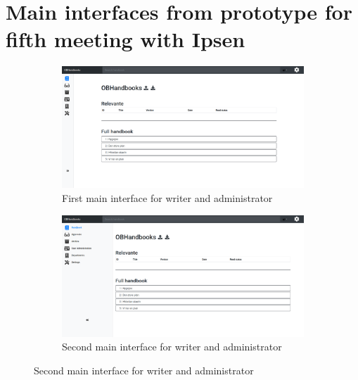 \section{Main interfaces from prototype for fifth meeting with Ipsen}\label{sec:3prototype}
\begin{figure}[H]
	\centering
	\begin{subfigure}[b]{0.48\textwidth}
		\includegraphics[width=\textwidth]{billeder/iteration3Prototyper/MainWriteAdmin.png}
		\caption{First main interface for writer and administrator}
		\label{fig:5-Main1Write}
	\end{subfigure}
	\quad
	\begin{subfigure}[b]{0.48\textwidth}
		\includegraphics[width=\textwidth]{billeder/iteration3Prototyper/MainWriteAdmin2.png}
		\caption{Second main interface for writer and administrator}
		\label{fig:5-Main2write}
	\end{subfigure}
\end{figure}
